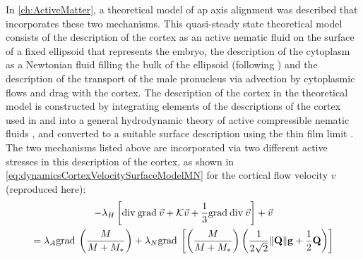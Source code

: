 In \autoref{ch:ActiveMatter}, a theoretical model of \ac{ap} axis alignment was described that incorporates these two mechanisms. This quasi-steady state theoretical model consists of the description of the cortex as an active nematic fluid on the surface of a fixed ellipsoid that represents the embryo, the description of the cytoplasm as a Newtonian fluid filling the bulk of the ellipsoid (following \cite{niwayama2011hydrodynamic}) and the description of the transport of the male pronucleus via advection by cytoplasmic flows and drag with the cortex. The description of the cortex in the theoretical model is constructed by integrating elements of the descriptions of the cortex used in \cite{gross2019guiding} and \cite{reymann2016cortical} into a general hydrodynamic theory of active compressible nematic fluids \citep{julicher2018hydrodynamic}, and converted to a suitable surface description using the thin film limit \citep{nitschke2018nematic}. The two mechanisms listed above are incorporated via two different active stresses in this description of the cortex, as shown in \autoref{eq:dynamicsCortexVelocitySurfaceModelMN} for the cortical flow velocity $v$ (reproduced here):
\begin{multline*}\label{eq:dynamicsCortexVelocitySurfaceModelMNReproduceSummary}
    -\lambda_H\left[\mathrm{div}\:\mathrm{grad}\:\vec{v} + \mathcal{K}\vec{v} + \frac{1}{3}\mathrm{grad}\:\mathrm{div}\:\vec{v}\right] + \vec{v} \\= \lambda_A\mathrm{grad}\:\left(\frac{M}{M + M_*}\right) + \lambda_N \mathrm{grad}\:\left[\left(\frac{M}{M + M_*}\right)\left(\frac{1}{2\sqrt{2}}\norm{\mathbf{Q}}\mathbf{g} + \frac{1}{2}\mathbf{Q}\right)\right]    
\end{multline*}
